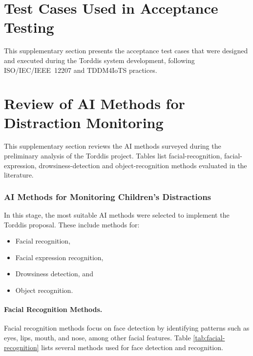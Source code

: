 
\section{Test Cases Used in Acceptance Testing}
\label{sup:test-cases}
This supplementary section presents the acceptance test cases that were designed and executed during the Torddis system development, following ISO/IEC/IEEE~12207 and TDDM4IoTS practices.



\section{Review of AI Methods for Distraction Monitoring}
\label{sup:ai-methods}
This supplementary section reviews the AI methods surveyed during the preliminary analysis of the Torddis project. Tables list facial-recognition, facial-expression, drowsiness-detection and object-recognition methods evaluated in the literature.

\subsubsection{AI Methods for Monitoring Children's Distractions}
                In this stage, the most suitable AI methods were selected to implement the Torddis proposal. These include methods for:
                
                \begin{itemize}
                    \item Facial recognition,
                    
                    \item Facial expression recognition,
                    
                    \item Drowsiness detection, and
                    
                    \item Object recognition.
                \end{itemize}
                
                \paragraph{Facial Recognition Methods.}
                Facial recognition methods focus on face detection by identifying patterns such as eyes, lips, mouth, and nose, among other facial features. Table \ref{tab:facial-recognition} lists several methods used for face detection and recognition.
                
